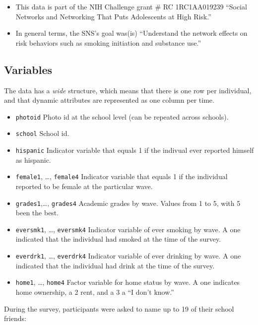 \documentclass[
]{book}
\begin{document}
\begin{itemize}
\item
  This data is part of the NIH Challenge grant \# RC 1RC1AA019239 ``Social
  Networks and Networking That Puts Adolescents at High Risk.''
\item
  In general terms, the SNS's goal was(is) ``Understand the network effects on
  risk behaviors such as smoking initiation and substance use.''
\end{itemize}

\hypertarget{variables}{%
\subsection{Variables}\label{variables}}

The data has a \emph{wide} structure, which means that there is one row per individual,
and that dynamic attributes are represented as one column per time.

\begin{itemize}
\item
  \texttt{photoid} Photo id at the school level (can be repeated across schools).
\item
  \texttt{school} School id.
\item
  \texttt{hispanic} Indicator variable that equals 1 if the indivual ever reported
  himself as hispanic.
\item
  \texttt{female1}, \ldots, \texttt{female4} Indicator variable that equals 1 if the individual
  reported to be female at the particular wave.
\item
  \texttt{grades1},\ldots, \texttt{grades4} Academic grades by wave. Values from 1 to 5, with 5
  been the best.
\item
  \texttt{eversmk1}, \ldots, \texttt{eversmk4} Indicator variable of ever smoking by wave. A one
  indicated that the individual had smoked at the time of the survey.
\item
  \texttt{everdrk1}, \ldots, \texttt{everdrk4} Indicator variable of ever drinking by wave.
  A one indicated that the individual had drink at the time of the survey.
\item
  \texttt{home1}, \ldots, \texttt{home4} Factor variable for home status by wave. A one
  indicates home ownership, a 2 rent, and a 3 a ``I don't know.''
\end{itemize}

During the survey, participants were asked to name up to 19 of their school
friends:
\end{document}
